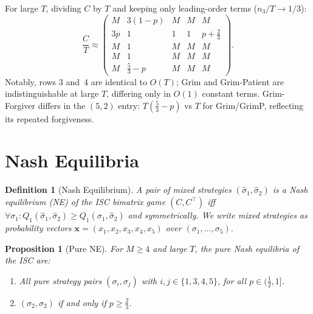 \documentclass[12pt,a4paper]{article}
\newtheorem{definition}{Definition}[section]
\newtheorem{proposition}{Proposition}[section]
\begin{document}
For large $T$, dividing $C$ by $T$ and keeping only leading-order terms
($n_3/T \to 1/3$):
\begin{equation}\label{eq:Capprox}
\frac{C}{T} \approx \begin{pmatrix}
M & 3(1-p) & M & M & M \\
3p & 1 & 1 & 1 & p+\tfrac{2}{3} \\
M & 1 & M & M & M \\
M & 1 & M & M & M \\
M & \tfrac{5}{3}-p & M & M & M
\end{pmatrix}.
\end{equation}
Notably, rows 3 and~4 are identical to $O(T)$; Grim and Grim-Patient are
indistinguishable at large $T$, differing only in $O(1)$ constant terms.
Grim-Forgiver differs in the $(5,2)$ entry: $T(\tfrac{5}{3}-p)$ vs $T$ for
Grim/GrimP, reflecting its repeated forgiveness.

\section{Nash Equilibria}
\label{sec:NE}

\begin{definition}[Nash Equilibrium]\label{def:NE}
A pair of mixed strategies $(\hat\sigma_1,\hat\sigma_2)$ is a
\emph{Nash equilibrium} (NE) of the ISC bimatrix game $(C,C^\top)$ iff
$\forall\sigma_1: Q_1(\hat\sigma_1,\hat\sigma_2)\geq Q_1(\sigma_1,\hat\sigma_2)$
and symmetrically.  We write mixed strategies as probability vectors
$\mathbf{x}=(x_1,x_2,x_3,x_4,x_5)$ over $(\sigma_1,\ldots,\sigma_5)$.
\end{definition}

\begin{proposition}[Pure NE]\label{prop:pureNE}
For $M\geq 4$ and large $T$, the pure Nash equilibria of the ISC are:
\begin{enumerate}
  \item All pure strategy pairs $(\sigma_i,\sigma_j)$ with
        $i,j\in\{1,3,4,5\}$, for all $p\in(\tfrac{1}{2},1]$.
  \item $(\sigma_2,\sigma_2)$ if and only if $p\geq\tfrac{2}{3}$.
\end{enumerate}
\end{proposition}
\end{document}

